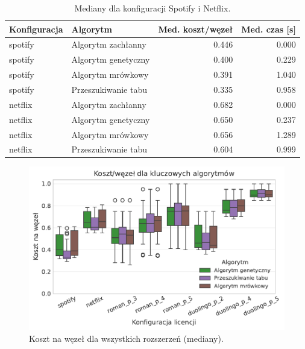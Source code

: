 \begin{table}[H]
  \centering
  \caption{Mediany dla konfiguracji Spotify i Netflix.}
  \label{tab:ext-additional-static}
  \begin{tabular}{llrr}
    \toprule
    \textbf{Konfiguracja} & \textbf{Algorytm}   & \textbf{Med. koszt/węzeł} & \textbf{Med. czas [s]} \\
    \midrule
    spotify               & Algorytm zachłanny  & 0.446                     & 0.000                  \\
    spotify               & Algorytm genetyczny & 0.400                     & 0.229                  \\
    spotify               & Algorytm mrówkowy   & 0.391                     & 1.040                  \\
    spotify               & Przeszukiwanie tabu & 0.335                     & 0.958                  \\
    netflix               & Algorytm zachłanny  & 0.682                     & 0.000                  \\
    netflix               & Algorytm genetyczny & 0.650                     & 0.237                  \\
    netflix               & Algorytm mrówkowy   & 0.656                     & 1.289                  \\
    netflix               & Przeszukiwanie tabu & 0.604                     & 0.999                  \\
  \end{tabular}
\end{table}

\begin{figure}[H]
  \centering
  \includegraphics[width=0.6\linewidth]{assets/figures/extensions/static/cost_per_node_by_license_targets.pdf}
  \caption{Koszt na węzeł dla wszystkich rozszerzeń (mediany).}
  \label{fig:ext-license-cost}
\end{figure}

